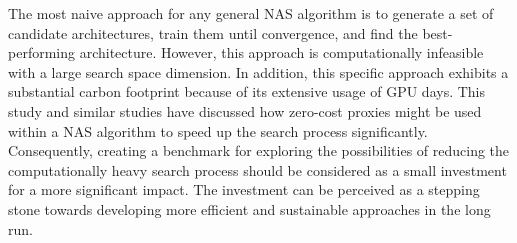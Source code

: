 The most naive approach for any general \gls{NAS} algorithm is to generate a set of candidate architectures, train them until convergence, and find the best-performing architecture. However, this approach is computationally infeasible with a large search space dimension. In addition, this specific approach exhibits a substantial carbon footprint because of its extensive usage of \gls{GPU} days. This study and similar studies \autocite{abdelfattah2021zero, colin2022adeeperlook} have discussed how zero-cost proxies might be used within a \gls{NAS} algorithm to speed up the search process significantly. Consequently, creating a benchmark for exploring the possibilities of reducing the computationally heavy search process should be considered as a small investment for a more significant impact. The investment can be perceived as a stepping stone towards developing more efficient and sustainable approaches in the long run.
